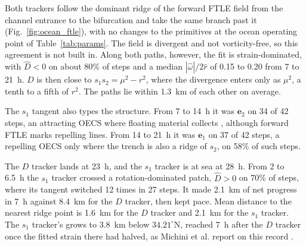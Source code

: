 Both trackers follow the dominant ridge of the forward FTLE field from the
channel entrance to the bifurcation and take the same branch past it
(Fig.~\ref{fig:ocean_ftle}), with no changes to the primitives at the
ocean operating point of Table~\ref{tab:params}. The field is divergent and
not vorticity-free, so this agreement is not built in. Along both paths,
however, the fit is strain-dominated, with $\hat{D} < 0$ on about
80\% of steps and a median $|\hat{\omega}|/2\hat{r}$ of 0.15 to 0.20 from
7 to 21~h. $D$ is then close to $s_1 s_2 = \mu^2 - r^2$, where the
divergence enters only as $\mu^2$, a tenth to a fifth of $r^2$. The paths
lie within 1.3~km of each other on average.

The $s_1$ tangent also types the structure. From 7 to 14~h it was
$\mathbf{e}_2$ on 34 of 42 steps, an attracting OECS where floating
material collects \cite{12}, although forward FTLE marks repelling
lines. From 14 to 21~h it was $\mathbf{e}_1$ on 37 of 42 steps, a
repelling OECS only where the trench is also a ridge of $s_2$, on 58\% of
such steps.

The $D$ tracker lands at 23~h, and the $s_1$ tracker is at sea at 28~h.
From 2 to 6.5~h the $s_1$ tracker crossed a
rotation-dominated patch, $\hat{D} > 0$ on 70\% of steps, where its
tangent switched 12 times in 27 steps. It made 2.1~km of net progress in
7~h against 8.4~km for the $D$ tracker, then kept pace. Mean distance to
the nearest ridge point is 1.6~km for the $D$ tracker and 2.1~km for the
$s_1$ tracker. The $s_1$
tracker's grows to 3.8~km below $34.21^{\circ}$N, reached 7~h after the
$D$ tracker once the fitted strain there had halved, as Michini et al.
report on this record \cite{26}.
